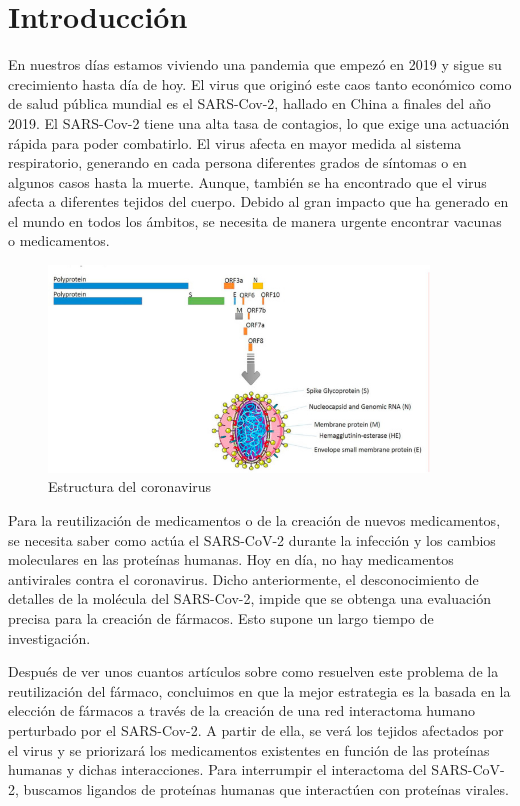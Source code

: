 \section{Introducción}

En nuestros días estamos viviendo una pandemia que empezó en 2019 y sigue su crecimiento hasta día de hoy. El virus que originó este caos tanto económico como de salud pública mundial es el SARS-Cov-2, hallado en China a finales del año 2019. El SARS-Cov-2 tiene una alta tasa de contagios, lo que exige una actuación rápida para poder combatirlo. El virus afecta en mayor medida al sistema respiratorio, generando en cada persona diferentes grados de síntomas o en algunos casos hasta la muerte. Aunque, también se ha encontrado que el virus afecta a diferentes tejidos del cuerpo. Debido al gran impacto que ha generado en el mundo en todos los ámbitos, se necesita de manera urgente encontrar vacunas o medicamentos. 

\begin{figure}[h!]
			\includegraphics[width=0.9\textwidth]{figures/gr1_lrg.jpg}
			\caption{Estructura del coronavirus}
			\label{fig:cost_genome}
		\end{figure}
\newpage
		
Para la reutilización de medicamentos o de la creación de nuevos medicamentos, se necesita saber como actúa el SARS-CoV-2 durante la infección y los cambios moleculares en las proteínas humanas. Hoy en día, no hay medicamentos antivirales contra el coronavirus. Dicho anteriormente, el desconocimiento de detalles de la molécula del SARS-Cov-2, impide que se obtenga una evaluación precisa para la creación de fármacos. Esto supone un largo tiempo de investigación.

Después de ver unos cuantos artículos sobre como resuelven este problema de la reutilización del fármaco, concluimos en que la mejor estrategia es la basada en la elección de fármacos a través de la creación de una red interactoma humano perturbado por el SARS-Cov-2. A partir de ella, se verá los tejidos afectados por el virus y se priorizará los medicamentos existentes en función de las proteínas humanas y dichas interacciones. Para interrumpir el interactoma del SARS-CoV-2, buscamos ligandos de proteínas humanas que interactúen con proteínas virales. 

		
